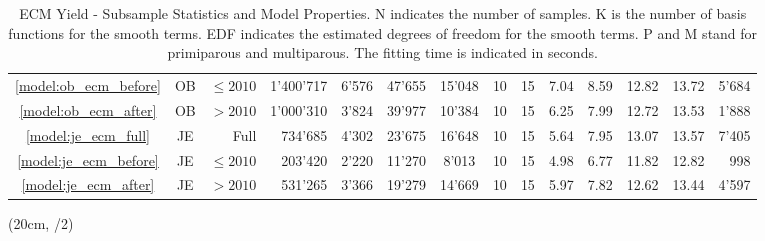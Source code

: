 \begin{landscape}
\begin{table}[htbp]
\begin{tabular}{c c r r r r c c c c c c c r}
            \textcolor{blue}{\ref{model:ob_ecm_before}}& OB & $\leq2010$ & 1'400'717 & 6'576 & 47'655 & 15'048 & 10 & 15 & 7.04 & 8.59 & 12.82 & 13.72 & 5'684\\
            \textcolor{blue}{\ref{model:ob_ecm_after}}& OB & $>2010$ & 1'000'310 & 3'824 & 39'977 & 10'384 & 10 & 15 & 6.25 & 7.99 & 12.72 & 13.53 & 1'888\\
            \hline
            \textcolor{blue}{\ref{model:je_ecm_full}}& JE & Full & 734'685 & 4'302 & 23'675 & 16'648 & 10 & 15 & 5.64 & 7.95 & 13.07 & 13.57& 7'405\\
            \textcolor{blue}{\ref{model:je_ecm_before}}& JE & $\leq2010$ & 203'420 & 2'220 & 11'270 & 8'013 & 10 & 15 & 4.98 & 6.77 & 11.82 & 12.82 & 998\\
            \textcolor{blue}{\ref{model:je_ecm_after}}& JE & $>2010$ & 531'265 & 3'366 & 19'279 & 14'669 & 10 & 15 & 5.97 & 7.82 & 12.62 & 13.44 & 4'597\\
            \bottomrule
        \end{tabular}
        \caption{ECM Yield - Subsample Statistics and Model Properties. N indicates the number of samples. K is the number of basis functions for the smooth terms. EDF indicates the estimated degrees of freedom for the smooth terms. P and M stand for primiparous and multiparous. The fitting time is indicated in seconds.}
        \label{table:ecm_yield_subsample_stats_model_props}
    \end{table}
\begin{textblock*}{2cm}(20cm, \dimexpr\paperheight/2)
\end{textblock*}
\end{landscape}
\newpage

